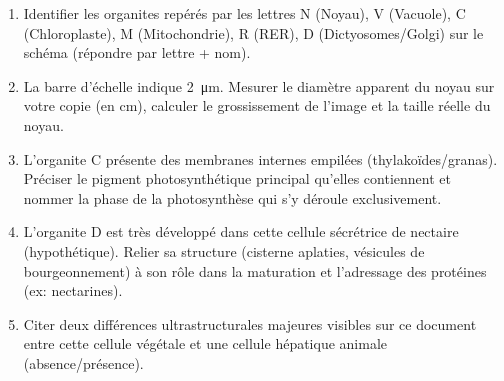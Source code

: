 \documentclass[11pt]{article}
\begin{document}
\begin{exercice}
\begin{enumerate}
\item Identifier les organites repérés par les lettres N (Noyau), V (Vacuole), C (Chloroplaste), M (Mitochondrie), R (RER), D (Dictyosomes/Golgi) sur le schéma (répondre par lettre + nom).
\item La barre d'échelle indique \SI{2}{\micro\meter}. Mesurer le diamètre apparent du noyau sur votre copie (en cm), calculer le grossissement de l'image et la taille réelle du noyau.
\item L'organite C présente des membranes internes empilées (thylakoïdes/granas). Préciser le pigment photosynthétique principal qu'elles contiennent et nommer la phase de la photosynthèse qui s'y déroule exclusivement.
\item L'organite D est très développé dans cette cellule sécrétrice de nectaire (hypothétique). Relier sa structure (cisterne aplaties, vésicules de bourgeonnement) à son rôle dans la maturation et l'adressage des protéines (ex: nectarines).
\item Citer deux différences ultrastructurales majeures visibles sur ce document entre cette cellule végétale et une cellule hépatique animale (absence/présence).
\end{enumerate}
\end{exercice}
\end{document}
